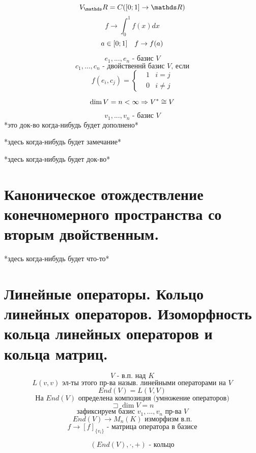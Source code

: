 \documentclass[12pt, fleqn]{article}
\begin{document}
			\begin{Example}
					\[V_\R = C([0;1] \to \R)\]
					\[f \to  \int_{0}^1 f(x)dx\]
					\[a \in [0; 1] \quad f \to f(a)\]
			\end{Example}

			\begin{Definition}
				\[e_1, ..., e_n \text{ - базис }V\]
				\[c_1, ..., c_n \text{ - двойственнй базис } V \text{, если}\]
				\[f(e_i, c_j) = \begin{cases}
						&1 & i = j\\
						&0 & i \neq j
				\end{cases}\]
			\end{Definition}

			\begin{Theorem}
					\[\dim V = n < \infty \Rightarrow V^* \cong V\]
			\end{Theorem}
			\begin{Proof}
					\[v_1, ..., v_n \text{ - базис } V\]
          *это док-во когда-нибудь будет дополнено*
			\end{Proof}

      \begin{remark}
        *здесь когда-нибудь будет замечание*
      \end{remark}

      \begin{example}
        *здесь когда-нибудь будет док-во*
      \end{example}

  \section{Каноническое отождествление конечномерного пространства со вторым двойственным.}

  *здесь когда-нибудь будет что-то*

	\section{Линейные операторы. Кольцо линейных операторов. Изоморфность кольца линейных операторов и кольца матриц.}
			\[V \text{ - в.п. над } K\]
			\[L(v, v) \text{ эл-ты этого пр-ва назыв. линейными операторами на }V\]
			\[End(V) = L(V, V)\]
			\[\text{На } End(V) \text{ определена композиция (умножение операторов)}\]
			\[\sqsupset \dim V = n\]
			\[\text{зафиксируем базис } v_1, ..., v_n \text{ пр-ва } V\]
			\[End(V) \to M_n (K) \text{ изморфизм в.п.}\]
			\[f \to [f]_{\{v_i\}} \text{ - матрица оператора в базисе} \]
			\begin{theorem}
				\[(End(V), \cdot, +) \text{ - кольцо}\]
			\end{theorem}
\end{document}
